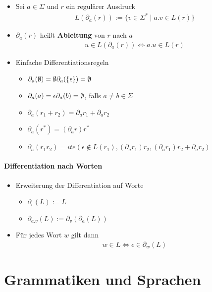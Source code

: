 \documentclass{scrartcl}
\begin{document}
\begin{itemize}
	\item Sei $a \in \Sigma$ und $r$ ein regulärer Ausdruck
	\begin{align*}
		L(\partial_a(r)) := \{ v \in \Sigma^* \mid a.v \in L(r) \}
	\end{align*}
	\item $\partial_a(r)$ heißt \textbf{Ableitung} von $r$ nach $a$
	\begin{align*}
		u \in L(\partial_a(r)) \iff a.u \in L(r)
	\end{align*}
	\item Einfache Differentiationsregeln
	\begin{itemize}
		\item $\partial_a(\emptyset) = \emptyset \hfill \partial_a(\{ \epsilon \}) = \emptyset$
		\item $\partial_a(a) = \epsilon \hfill \partial_a(b) = \emptyset$, falls $a \neq b \in \Sigma$
		\item $\partial_a(r_1 + r_2) = \partial_a r_1 + \partial_a r_2$
		\item $\partial_a(r^*) = (\partial_a r)r^*$
		\item $\partial_a(r_1 r_2) = ite(\epsilon \not \in L(r_1), (\partial_a r_1)r_2, (\partial_a r_1)r_2 + \partial_a r_2)$
	\end{itemize}
\end{itemize}

\paragraph{Differentiation nach Worten}

\begin{itemize}
	\item Erweiterung der Differentiation auf Worte
	\begin{itemize}
		\item $\partial_\epsilon(L) := L$
		\item $\partial_{a.v}(L) := \partial_v(\partial_a(L))$
	\end{itemize}
	\item Für jedes Wort $w$ gilt dann
	\begin{align*}
		w \in L \iff \epsilon \in \partial_w(L)
	\end{align*}
\end{itemize}

\pagebreak
\section{Grammatiken und Sprachen}
\end{document}

